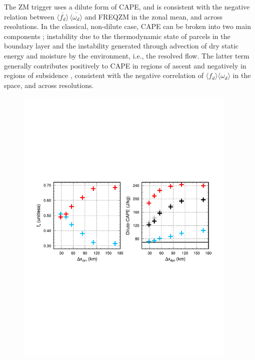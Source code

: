 The ZM trigger uses a dilute form of CAPE, and is consistent with the negative relation between $\overline{\langle f_{d} \rangle} \, \overline{\langle \omega_{d} \rangle}$ and FREQZM in the zonal mean, and across resolutions. In the classical, non-dilute case, CAPE can be broken into two main components \citep{Z2002JGR}; instability due to the thermodynamic state of parcels in the boundary layer and the instability generated through advection of dry static energy and moisture by the environment, i.e., the resolved flow. The latter term generally contributes positively to CAPE in regions of ascent and negatively in regions of subsidence \citep{SZ2018JCLIM}, consistent with the negative correlation of $\langle f_{d} \rangle \langle \omega_{d} \rangle$ in the space, and across resolutions.

\begin{figure}[t]
\begin{center}
\noindent\includegraphics[width=25pc,angle=0]{chapter6/temp_cape.pdf}\\
\end{center}
\caption{}
\label{fig:cape}
\end{figure}

